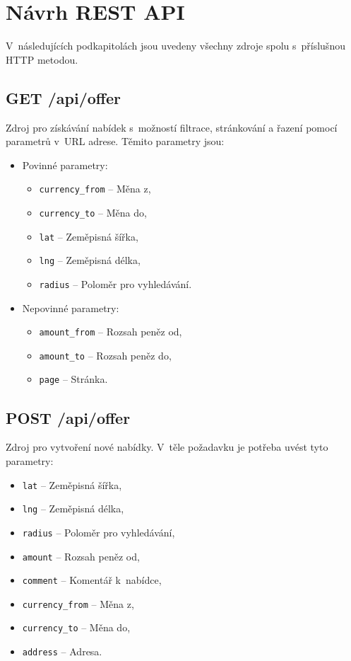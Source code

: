 \pagebreak
\section{Návrh REST API}\label{rest-api-design}
V~následujících podkapitolách jsou uvedeny všechny zdroje spolu s~příslušnou HTTP metodou.

\subsection{GET /api/offer}
Zdroj pro získávání nabídek s~možností filtrace, stránkování a řazení pomocí parametrů v~URL adrese. Těmito parametry jsou:
\begin{itemize}
    \item Povinné parametry:
    \begin{itemize}
        \item \texttt{currency\_from} -- Měna z,
        \item \texttt{currency\_to} -- Měna do,
        \item \texttt{lat} -- Zeměpisná šířka,
        \item \texttt{lng} -- Zeměpisná délka,
        \item \texttt{radius} -- Poloměr pro vyhledávání.
    \end{itemize}
    \item Nepovinné parametry:
    \begin{itemize}
        \item \texttt{amount\_from} -- Rozsah peněz od,
        \item \texttt{amount\_to} -- Rozsah peněz do,
        \item \texttt{page} -- Stránka.
    \end{itemize}
\end{itemize}

\subsection{POST /api/offer}
Zdroj pro vytvoření nové nabídky. V~těle požadavku je potřeba uvést tyto parametry:
\begin{itemize}
    \item \texttt{lat} -- Zeměpisná šířka,
    \item \texttt{lng} -- Zeměpisná délka,
    \item \texttt{radius} -- Poloměr pro vyhledávání,
    \item \texttt{amount} -- Rozsah peněz od,
    \item \texttt{comment} -- Komentář k~nabídce,
    \item \texttt{currency\_from} -- Měna z,
    \item \texttt{currency\_to} -- Měna do,
    \item \texttt{address} -- Adresa.
\end{itemize}

